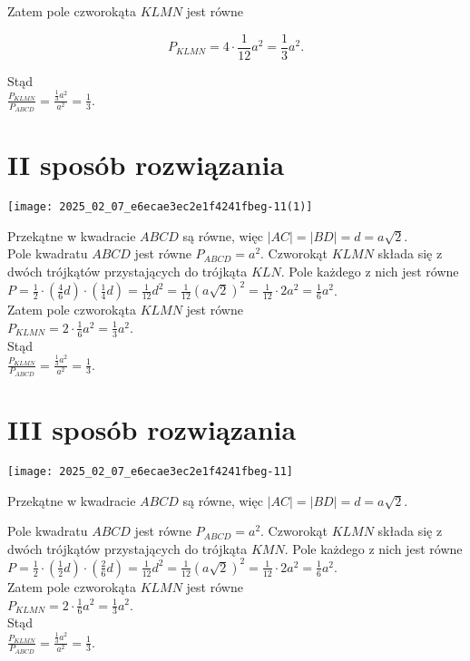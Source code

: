 \documentclass[10pt]{article}
\begin{document}
Zatem pole czworokąta $K L M N$ jest równe

$$
P_{K L M N}=4 \cdot \frac{1}{12} a^{2}=\frac{1}{3} a^{2} .
$$

Stąd\\
$\frac{P_{K L M N}}{P_{A B C D}}=\frac{\frac{1}{3} a^{2}}{a^{2}}=\frac{1}{3}$.

\section*{II sposób rozwiązania}
\begin{center}
\texttt{[image: 2025\_02\_07\_e6ecae3ec2e1f4241fbeg-11(1)]}
\end{center}

Przekątne w kwadracie $A B C D$ są równe, więc $|A C|=|B D|=d=a \sqrt{2}$.\\
Pole kwadratu $A B C D$ jest równe $P_{A B C D}=a^{2}$. Czworokąt $K L M N$ składa się z dwóch trójkątów przystających do trójkąta $K L N$. Pole każdego z nich jest równe\\
$P=\frac{1}{2} \cdot\left(\frac{4}{6} d\right) \cdot\left(\frac{1}{4} d\right)=\frac{1}{12} d^{2}=\frac{1}{12}(a \sqrt{2})^{2}=\frac{1}{12} \cdot 2 a^{2}=\frac{1}{6} a^{2}$.\\
Zatem pole czworokąta $K L M N$ jest równe\\
$P_{K L M N}=2 \cdot \frac{1}{6} a^{2}=\frac{1}{3} a^{2}$.\\
Stąd\\
$\frac{P_{K L M N}}{P_{A B C D}}=\frac{\frac{1}{3} a^{2}}{a^{2}}=\frac{1}{3}$.

\section*{III sposób rozwiązania}
\begin{center}
\texttt{[image: 2025\_02\_07\_e6ecae3ec2e1f4241fbeg-11]}
\end{center}

Przekątne w kwadracie $A B C D$ są równe, więc $|A C|=|B D|=d=a \sqrt{2}$.

Pole kwadratu $A B C D$ jest równe $P_{A B C D}=a^{2}$. Czworokąt $K L M N$ składa się z dwóch trójkątów przystających do trójkąta $K M N$. Pole każdego z nich jest równe\\
$P=\frac{1}{2} \cdot\left(\frac{1}{2} d\right) \cdot\left(\frac{2}{6} d\right)=\frac{1}{12} d^{2}=\frac{1}{12}(a \sqrt{2})^{2}=\frac{1}{12} \cdot 2 a^{2}=\frac{1}{6} a^{2}$.\\
Zatem pole czworokąta $K L M N$ jest równe\\
$P_{K L M N}=2 \cdot \frac{1}{6} a^{2}=\frac{1}{3} a^{2}$.\\
Stąd\\
$\frac{P_{K L M N}}{P_{A B C D}}=\frac{\frac{1}{3} a^{2}}{a^{2}}=\frac{1}{3}$.
\end{document}

